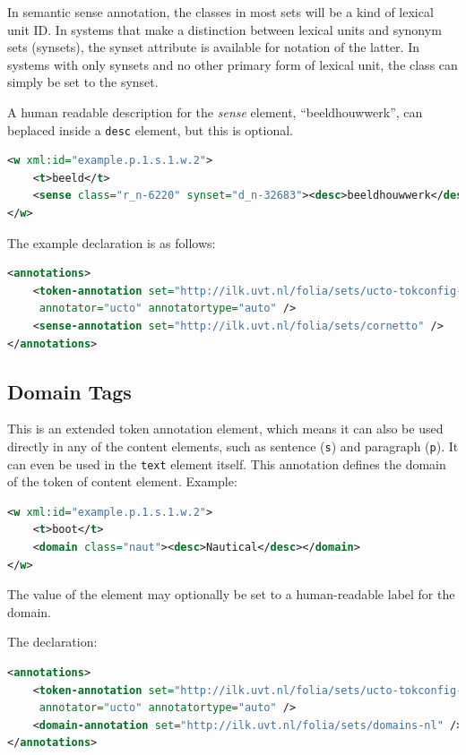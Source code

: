 \documentclass[a4paper,12pt]{report}
\begin{document}
In semantic sense annotation, the classes in most sets will be a kind of lexical unit ID. In systems that make a distinction between lexical units and synonym sets (synsets), the synset attribute is available for notation of the latter. In systems with only synsets and no other primary form of lexical unit, the class can simply be set to the synset.

A human readable description for the \emph{sense} element, ``beeldhouwwerk'', can beplaced inside a \texttt{desc} element, but this is optional.

\begin{lstlisting}[language=xml]
<w xml:id="example.p.1.s.1.w.2">
    <t>beeld</t>
    <sense class="r_n-6220" synset="d_n-32683"><desc>beeldhouwwerk</desc></sense>
</w>
\end{lstlisting}

The example declaration is as follows:

\begin{lstlisting}[language=xml]
<annotations>
    <token-annotation set="http://ilk.uvt.nl/folia/sets/ucto-tokconfig-nl"
     annotator="ucto" annotatortype="auto" />
    <sense-annotation set="http://ilk.uvt.nl/folia/sets/cornetto" />
</annotations>
\end{lstlisting}

\subsection{Domain Tags}

This is an extended token annotation element, which means it can also be used directly in any of the content elements, such as sentence (\texttt{s}) and  paragraph (\texttt{p}). It can even be used in the \texttt{text} element itself. This annotation defines the domain of the token of content element. Example:

\begin{lstlisting}[language=xml]
<w xml:id="example.p.1.s.1.w.2">
    <t>boot</t>
    <domain class="naut"><desc>Nautical</desc></domain>
</w>
\end{lstlisting}

The value of the element may optionally be set to a human-readable label for the domain.

The declaration:

\begin{lstlisting}[language=xml]
<annotations>
    <token-annotation set="http://ilk.uvt.nl/folia/sets/ucto-tokconfig-nl"
     annotator="ucto" annotatortype="auto" />
    <domain-annotation set="http://ilk.uvt.nl/folia/sets/domains-nl" />
</annotations>
\end{lstlisting}
\end{document}
